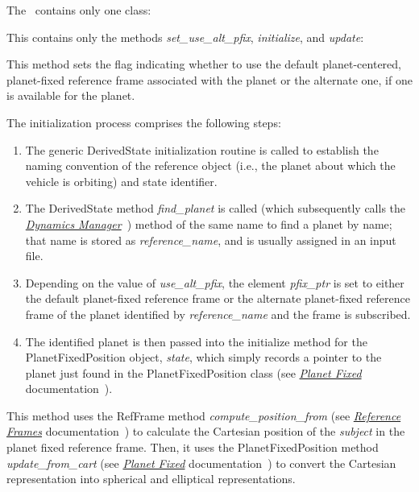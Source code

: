 The \PlanetaryDesc\ contains only one class:
\begin{itemize}

This contains only the methods \textit{set\_use\_alt\_pfix}, \textit{initialize}, and \textit{update}:
\begin{enumerate}
This method sets the flag indicating whether to use the default planet-centered, planet-fixed reference frame associated with the planet or the alternate one, if one is available for the planet.

The initialization process comprises the following steps:
\begin{enumerate}
\item{} The generic DerivedState initialization routine is called to establish the naming convention of the reference object (i.e., the planet about which the vehicle is orbiting) and state identifier.
\item{} The DerivedState method \textit{find\_planet} is called (which subsequently calls the  \href{file:\JEODHOME/models/dynamics/dyn_manager/docs/dyn_manager.pdf}{\em Dynamics Manager}~\cite{dynenv:DYNMANAGER}) method of the same name to find a planet by name; that name is stored as \textit{reference\_name}, and is usually assigned in an input file.
\item{} Depending on the value of \textit{use\_alt\_pfix}, the element \textit{pfix\_ptr} is set to either the default planet-fixed reference frame or the alternate planet-fixed reference frame of the planet identified by \textit{reference\_name} and the frame is subscribed.
\item{} The identified planet is then passed into the initialize method for the PlanetFixedPosition object, \textit{state}, which simply records a pointer to the planet just found in the PlanetFixedPosition class (see \href{file:\JEODHOME/models/utils/planet\_fixed/docs/planet\_fixed.pdf}{\em Planet Fixed} documentation~\cite{dynenv:PLANETFIXED}).
\end{enumerate}

This method uses the RefFrame method \textit{compute\_position\_from} (see \href{file:\JEODHOME/models/utils/ref\_frames/docs/ref\_frames.pdf}{\em Reference Frames} documentation~\cite{dynenv:REFFRAMES}) to calculate the Cartesian position of the \textit{subject} in the planet fixed reference frame.  Then, it uses the PlanetFixedPosition method \textit{update\_from\_cart} 
(see \href{file:\JEODHOME/models/utils/planet\_fixed/docs/planet\_fixed.pdf}{\em Planet Fixed} documentation~\cite{dynenv:PLANETFIXED}) 
to convert the Cartesian representation into spherical and elliptical representations.

\end{enumerate}
\end{itemize}
